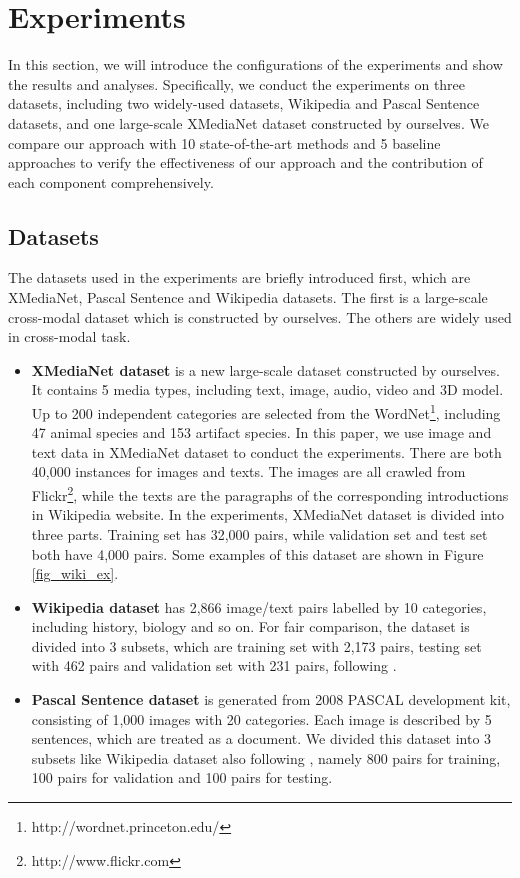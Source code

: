 \documentclass[journal]{IEEEtran}
\begin{document}
\section{Experiments}

In this section, we will introduce the configurations of the experiments and show the results and analyses. Specifically, we conduct the experiments on three datasets, including two widely-used datasets, Wikipedia and Pascal Sentence datasets, and one large-scale XMediaNet dataset constructed by ourselves. We compare our approach with 10 state-of-the-art methods and 5 baseline approaches to verify the effectiveness of our approach and the contribution of each component comprehensively. 


\subsection{Datasets}

The datasets used in the experiments are briefly introduced first, which are XMediaNet, Pascal Sentence and Wikipedia datasets. The first is a large-scale cross-modal dataset which is constructed by ourselves. The others are widely used in cross-modal task.

\begin{itemize}
	\item {  \textbf{XMediaNet dataset}} is a new large-scale dataset constructed by ourselves. It contains 5 media types, including text, image, audio, video and 3D model. Up to 200 independent categories are selected from the WordNet\footnote{http://wordnet.princeton.edu/}, including 47 animal species and 153 artifact species. In this paper, we use image and text data in XMediaNet dataset to conduct the experiments. There are both 40,000 instances for images and texts. The images are all crawled from Flickr\footnote{http://www.flickr.com}, while the texts are the paragraphs of the corresponding introductions in Wikipedia website. In the experiments, XMediaNet dataset is divided into three parts. Training set has 32,000 pairs, while validation set and test set both have 4,000 pairs. Some examples of this dataset are shown in Figure \ref{fig_wiki_ex}.
	
	\item { \textbf{Wikipedia dataset}} \cite{RasiwasiaMM10SemanticCCA} has 2,866 image/text pairs labelled by 10 categories, including history, biology and so on. For fair comparison, the dataset is divided into 3 subsets, which are training set with 2,173 pairs, testing set with 462 pairs and validation set with 231 pairs, following \cite{DBLP:conf/ijcai/PengHQ16,feng12014cross}.
	
	\item {  \textbf{Pascal Sentence dataset}} \cite{rashtchian2010collecting} is generated from 2008 PASCAL development kit, consisting of 1,000 images with 20 categories. Each image is described by 5 sentences, which are treated as a document. We divided this dataset into 3 subsets like Wikipedia dataset also following \cite{DBLP:conf/ijcai/PengHQ16,feng12014cross}, namely 800 pairs for training, 100 pairs for validation and 100 pairs for testing.
	
	
\end{itemize}
\end{document}
